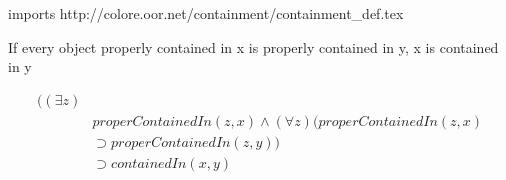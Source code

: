 imports http://colore.oor.net/containment/containment_def.tex

If every object properly contained in x is properly contained in y, x is contained in y

\begin{align*}
((\exists z)\\
& properContainedIn(z,x) \wedge (\forall z) (properContainedIn(z,x)\\
&\supset properContainedIn(z,y))\\
&\supset containedIn(x,y)
\end{align*}
